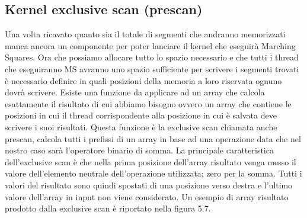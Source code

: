 \documentclass[12pt,a4paper]{report}
\begin{document}
\subsection{Kernel exclusive scan (prescan)}
Una volta ricavato quanto sia il totale di segmenti che andranno memorizzati manca ancora un componente per poter lanciare il kernel che eseguirà Marching Squares. \newline
Ora che possiamo allocare tutto lo spazio necessario e che tutti i thread che eseguiranno MS avranno uno spazio sufficiente per scrivere i segmenti trovati è necessario definire in quali posizioni della memoria a loro riservata ognuno dovrà scrivere. \newline
Esiste una funzione da applicare ad un array che calcola esattamente il risultato di cui abbiamo bisogno ovvero un array che contiene le posizioni in cui il thread corrispondente alla posizione in cui è salvata deve scrivere i suoi risultati.
Questa funzione è la exclusive scan chiamata anche prescan, calcola tutti i prefissi di un array in base ad una operazione data che nel nostro caso sarà l'operatore binario di somma. \newline
La principale caratteristica dell'exclusive scan è che nella prima posizione dell'array risultato venga messo il valore dell'elemento neutrale dell'operazione utilizzata; zero per la somma. Tutti i valori del risultato sono quindi spostati di una posizione verso destra e l'ultimo valore dell'array in input non viene considerato. Un esempio di array risultato prodotto dalla exclusive scan è riportato nella figura 5.7.
\end{document}
